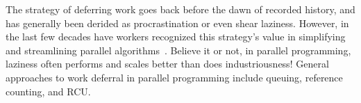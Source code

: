 

The strategy of deferring work goes back before the dawn of recorded
history, and has generally been derided as procrastination or
even shear laziness.
However, in the last few decades have workers recognized this strategy's value
in simplifying and streamlining parallel algorithms~\cite{Kung80,HMassalinPhD}.
Believe it or not, in parallel programming, laziness often performs and
scales better than does industriousness!
General approaches to work deferral in parallel programming include
queuing, reference counting, and RCU.







